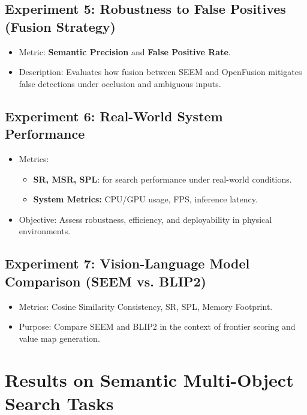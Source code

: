 \subsection{Experiment 5: Robustness to False Positives (Fusion Strategy)}
\begin{itemize}
    \item Metric: \textbf{Semantic Precision} and \textbf{False Positive Rate}.
    \item Description: Evaluates how fusion between \ac{SEEM} and OpenFusion mitigates false detections under occlusion and ambiguous inputs.
\end{itemize}

\subsection{Experiment 6: Real-World System Performance}
\begin{itemize}
    \item Metrics:
        \begin{itemize}
            \item \textbf{SR, MSR, SPL}: for search performance under real-world conditions.
            \item \textbf{System Metrics:} CPU/GPU usage, FPS, inference latency.
        \end{itemize}
    \item Objective: Assess robustness, efficiency, and deployability in physical environments.
\end{itemize}

\subsection{Experiment 7: Vision-Language Model Comparison (SEEM vs. BLIP2)}
\begin{itemize}
    \item Metrics: Cosine Similarity Consistency, SR, SPL, Memory Footprint.
    \item Purpose: Compare SEEM and BLIP2 in the context of frontier scoring and value map generation.
\end{itemize}

\section{Results on Semantic Multi-Object Search Tasks}

